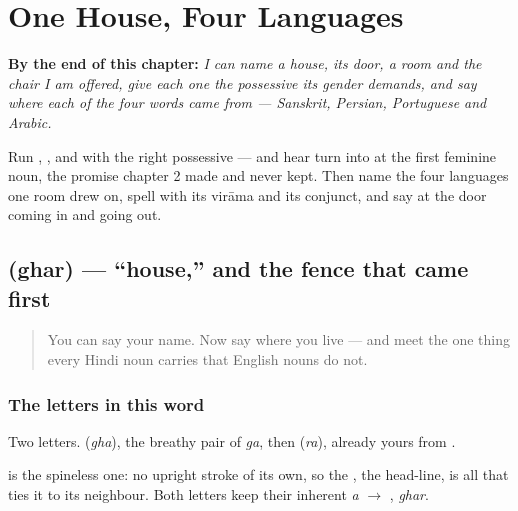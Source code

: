 
\chapter{One House, Four Languages}
\label{ch:hi-one-house-four-languages}

\begin{chapteropening}
\textbf{By the end of this chapter:} \emph{I can name a house, its door, a room and the chair I am offered, give each one the possessive its gender demands, and say where each of the four words came from — Sanskrit, Persian, Portuguese and Arabic.}

Run , ,  and  with the right possessive — and hear  turn into  at the first feminine noun, the promise chapter 2 made and never kept. Then name the four languages one room drew on, spell  with its virāma and its conjunct, and say  at the door coming in and   going out.
\end{chapteropening}

\section[\texorpdfstring{\hi{घर} (ghar)}{घर (ghar)}]{ (ghar) — \textquotedblleft{}house,\textquotedblright{} and the fence that came first}

\label{lesson:HI-C36-ghar}



\begin{quote}
You can say your name. Now say where you live — and meet the one thing every Hindi noun carries that English nouns do not.
\end{quote}

\subsection*{The letters in this word}
Two letters. \textbf{} (\emph{gha}), the breathy pair of \emph{ga}, then \textbf{} (\emph{ra}), already yours from \textbf{}.

\textbf{} is the spineless one: no upright stroke of its own, so the \textbf{}, the head-line, is all that ties it to its neighbour. Both letters keep their inherent \emph{a} $\to$ \textbf{}, \emph{ghar}.

